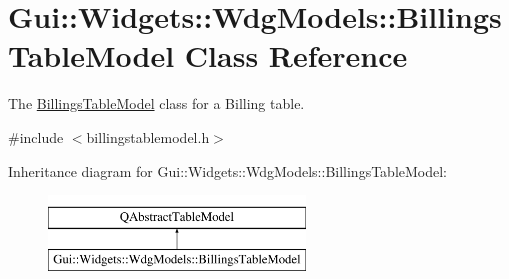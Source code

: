 \hypertarget{classGui_1_1Widgets_1_1WdgModels_1_1BillingsTableModel}{\section{Gui\-:\-:Widgets\-:\-:Wdg\-Models\-:\-:Billings\-Table\-Model Class Reference}
\label{classGui_1_1Widgets_1_1WdgModels_1_1BillingsTableModel}
}


The \hyperlink{classGui_1_1Widgets_1_1WdgModels_1_1BillingsTableModel}{Billings\-Table\-Model} class for a Billing table.  




{\ttfamily \#include $<$billingstablemodel.\-h$>$}

Inheritance diagram for Gui\-:\-:Widgets\-:\-:Wdg\-Models\-:\-:Billings\-Table\-Model\-:\begin{figure}[H]
\begin{center}
\leavevmode
\includegraphics[height=2.000000cm]{dc/d82/classGui_1_1Widgets_1_1WdgModels_1_1BillingsTableModel}
\end{center}
\end{figure}
